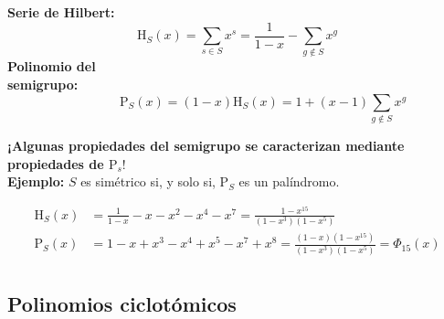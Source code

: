 \documentclass[10pt,compress]{beamer}
\begin{document}
\begin{frame}
  \begin{definition}
    \vspace{2mm}
    \textbf{Serie de Hilbert:}
    \vspace{-8mm}
    \[ \mathrm{H}_S(x) = \sum_{s \in S} x^s = \frac{1}{1-x} - \sum_{g \not \in S} x^{g} \]
    \textbf{Polinomio del \\ semigrupo:}
    \vspace{-10mm}
    \[ \qquad \qquad \mathrm{P}_S(x) = (1-x) \mathrm{H}_S(x) = 1 + (x-1)\sum_{g \not \in S} x^{g} \]
    \vspace{-3mm}
  \end{definition}

  \begin{tcolorbox}[colback=ChetwodeBlue!10,colframe=ChetwodeBlue!60]
    \begin{center}
      {\color{TurkishRose}\textbf{¡Algunas propiedades del semigrupo se caracterizan mediante
          propiedades de $\mathrm{P}_s$}!} \\
      \textbf{Ejemplo:} $S$ es simétrico si, y solo si, $\mathrm{P}_S$ es un palíndromo.
    \end{center}
  \end{tcolorbox}
  
  \begin{example}[$S = \langle 3,5 \rangle = \{0, 3, 5, 6, 8, \rightarrow\}$]
    \vspace*{-7mm}
    \begin{align*}
      \mathrm{H}_S(x) & = \frac{1}{1-x} - x - x^2 -x^4 - x^7 = \frac{1 - x^{15}}{(1-x^3)(1-x^5)} \\
      \mathrm{P}_S(x) & = 1 - x + x^3 - x^4 + x^5 - x^7 + x^8 = \frac{(1-x)(1 - x^{15})}{(1-x^3)(1-x^5)} = \Phi_{15}(x) \\
    \end{align*}  
    \vspace*{-12mm}
  \end{example}
\end{frame}

\subsection{Polinomios ciclotómicos}
\end{document}
